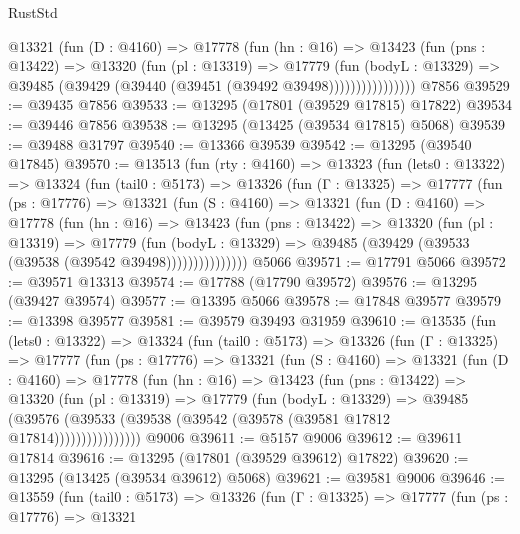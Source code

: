 \begin{lexlean}{RustStd}
\begin{coremodule}
                @13321
                  (fun (D : @4160) =>
                  @17778
                    (fun (hn : @16) =>
                    @13423
                      (fun (pns : @13422) =>
                      @13320
                        (fun (pl : @13319) =>
                        @17779
                          (fun (bodyL : @13329) =>
                          @39485 (@39429 (@39440 (@39451 (@39492 @39498))))))))))))))))
    @7856
@39529 := @39435 @7856
@39533 := @13295 (@17801 (@39529 @17815) @17822)
@39534 := @39446 @7856
@39538 := @13295 (@13425 (@39534 @17815) @5068)
@39539 := @39488 @31797
@39540 := @13366 @39539
@39542 := @13295 (@39540 @17845)
@39570 := @13513
    (fun (rty : @4160) =>
    @13323
      (fun (lets0 : @13322) =>
      @13324
        (fun (tail0 : @5173) =>
        @13326
          (fun (Γ : @13325) =>
          @17777
            (fun (ps : @17776) =>
            @13321
              (fun (S : @4160) =>
              @13321
                (fun (D : @4160) =>
                @17778
                  (fun (hn : @16) =>
                  @13423
                    (fun (pns : @13422) =>
                    @13320
                      (fun (pl : @13319) =>
                      @17779
                        (fun (bodyL : @13329) =>
                        @39485 (@39429 (@39533 (@39538 (@39542 @39498)))))))))))))))
    @5066
@39571 := @17791 @5066
@39572 := @39571 @13313
@39574 := @17788 (@17790 @39572)
@39576 := @13295 (@39427 @39574)
@39577 := @13395 @5066
@39578 := @17848 @39577
@39579 := @13398 @39577
@39581 := @39579 @39493 @31959
@39610 := @13535
    (fun (lets0 : @13322) =>
    @13324
      (fun (tail0 : @5173) =>
      @13326
        (fun (Γ : @13325) =>
        @17777
          (fun (ps : @17776) =>
          @13321
            (fun (S : @4160) =>
            @13321
              (fun (D : @4160) =>
              @17778
                (fun (hn : @16) =>
                @13423
                  (fun (pns : @13422) =>
                  @13320
                    (fun (pl : @13319) =>
                    @17779
                      (fun (bodyL : @13329) =>
                      @39485
                        (@39576
                          (@39533 (@39538 (@39542 (@39578 (@39581 @17812 @17814))))))))))))))))
    @9006
@39611 := @5157 @9006
@39612 := @39611 @17814
@39616 := @13295 (@17801 (@39529 @39612) @17822)
@39620 := @13295 (@13425 (@39534 @39612) @5068)
@39621 := @39581 @9006
@39646 := @13559
    (fun (tail0 : @5173) =>
    @13326
      (fun (Γ : @13325) =>
      @17777
        (fun (ps : @17776) =>
        @13321

\end{coremodule}
\end{lexlean}

